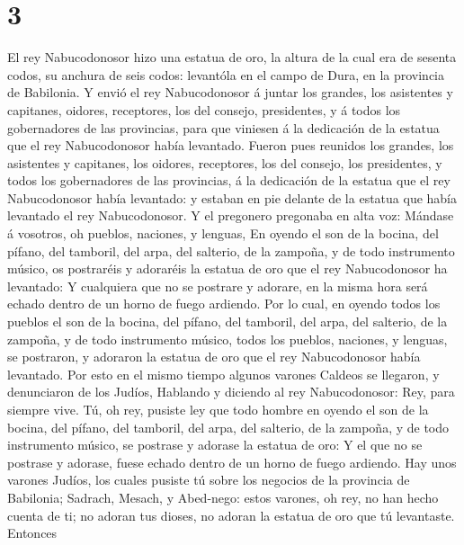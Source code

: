 \hypertarget{section-2}{%
\section{3}\label{section-2}}

 El rey Nabucodonosor hizo una estatua de oro, la altura
de la cual era de sesenta codos, su anchura de seis codos: levantóla en
el campo de Dura, en la provincia de Babilonia.  Y envió
el rey Nabucodonosor á juntar los grandes, los asistentes y capitanes,
oidores, receptores, los del consejo, presidentes, y á todos los
gobernadores de las provincias, para que viniesen á la dedicación de la
estatua que el rey Nabucodonosor había levantado.  Fueron
pues reunidos los grandes, los asistentes y capitanes, los oidores,
receptores, los del consejo, los presidentes, y todos los gobernadores
de las provincias, á la dedicación de la estatua que el rey
Nabucodonosor había levantado: y estaban en pie delante de la estatua
que había levantado el rey Nabucodonosor.  Y el pregonero
pregonaba en alta voz: Mándase á vosotros, oh pueblos, naciones, y
lenguas,  En oyendo el son de la bocina, del pífano, del
tamboril, del arpa, del salterio, de la zampoña, y de todo instrumento
músico, os postraréis y adoraréis la estatua de oro que el rey
Nabucodonosor ha levantado:  Y cualquiera que no se
postrare y adorare, en la misma hora será echado dentro de un horno de
fuego ardiendo.  Por lo cual, en oyendo todos los pueblos
el son de la bocina, del pífano, del tamboril, del arpa, del salterio,
de la zampoña, y de todo instrumento músico, todos los pueblos,
naciones, y lenguas, se postraron, y adoraron la estatua de oro que el
rey Nabucodonosor había levantado.  Por esto en el mismo
tiempo algunos varones Caldeos se llegaron, y denunciaron de los Judíos,
 Hablando y diciendo al rey Nabucodonosor: Rey, para
siempre vive.  Tú, oh rey, pusiste ley que todo hombre en
oyendo el son de la bocina, del pífano, del tamboril, del arpa, del
salterio, de la zampoña, y de todo instrumento músico, se postrase y
adorase la estatua de oro:  Y el que no se postrase y
adorase, fuese echado dentro de un horno de fuego ardiendo.
 Hay unos varones Judíos, los cuales pusiste tú sobre los
negocios de la provincia de Babilonia; Sadrach, Mesach, y Abed-nego:
estos varones, oh rey, no han hecho cuenta de ti; no adoran tus dioses,
no adoran la estatua de oro que tú levantaste.  Entonces
